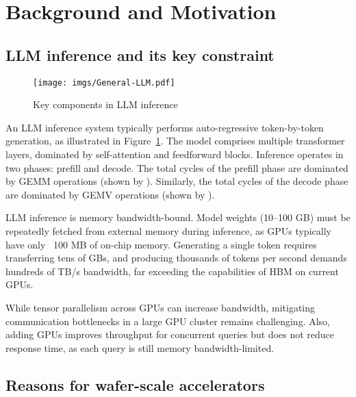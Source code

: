 \section{Background and Motivation}\label{sec:motivation}

\subsection{LLM inference and its key constraint}

\begin{figure}[t!]
    \centering
    \texttt{[image: imgs/General-LLM.pdf]}
    \vspace{-0.3cm}
    \caption{Key components in LLM inference}
    \label{fig:llm-inference-overview}
    \vspace{-0.3cm}
\end{figure}

An LLM inference system typically performs auto-regressive token-by-token generation, as illustrated in Figure~\ref{fig:llm-inference-overview}. The model comprises multiple transformer layers, dominated by self-attention and feedforward blocks. Inference operates in two phases: prefill and decode. The total cycles of the prefill phase are dominated by GEMM operations (shown by ). Similarly, the total cycles of the decode phase are dominated by GEMV operations (shown by ).

LLM inference is memory bandwidth-bound. Model weights (10–100 GB) must be repeatedly fetched from external memory during inference, as GPUs typically have only ~100 MB of on-chip memory. Generating a single token requires transferring tens of GBs, and producing thousands of tokens per second demands hundreds of TB/s bandwidth, far exceeding the capabilities of HBM on current GPUs. 

While tensor parallelism across GPUs can increase bandwidth, mitigating communication bottlenecks in a large GPU cluster remains challenging. Also, adding GPUs improves throughput for concurrent queries but does not reduce response time, as each query is still memory bandwidth-limited.

\vspace{-3mm}
\subsection{Reasons for wafer-scale accelerators}
\vspace{-1mm}

